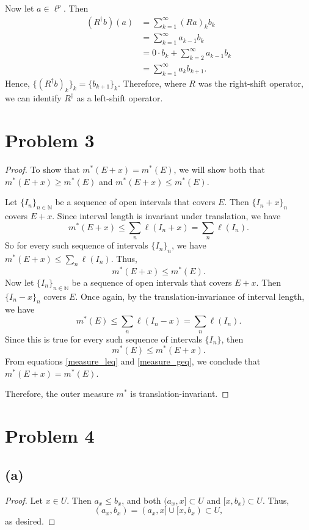 \documentclass{article}
\begin{document}
Now let $a\in\ell^p$. Then 
\begin{align}
	\left(R^{\dagger}b\right)(a) &= \sum_{k=1}^{\infty}\left(Ra\right)_k b_k \\
	&= \sum_{k=1}^{\infty} a_{k-1}b_k \\
	&= 0\cdot b_k + \sum_{k=2}^{\infty}a_{k-1}b_k \\
	&= \sum_{k=1}^{\infty}a_k b_{k+1}. 
\end{align}
Hence, $\{\left(R^{\dagger}b\right)_k\}_k = \{b_{k+1}\}_k$. Therefore, where $R$ was the right-shift operator, we can identify $R^{\dagger}$ as a left-shift operator.
\section*{Problem 3}
\begin{proof}
	To show that $m^*(E+x)=m^*(E)$, we will show both that \\$m^*(E+x)\geq m^*(E)$ and $m^*(E+x)\leq m^*(E)$.
	
	Let $\{I_n\}_{n\in\mathbb{N}}$ be a sequence of open intervals that covers $E$. Then $\{I_n + x\}_n$ covers $E+x$. Since interval length is invariant under translation, we have
	\begin{equation}
		m^*(E+x) \leq \sum_n \ell(I_n+x) = \sum_n\ell(I_n).
	\end{equation}
	So for every such sequence of intervals $\{I_n\}_n$, we have $m^*(E+x)\leq \sum_n\ell(I_n)$. Thus, 
	\begin{equation}\label{measure_leq}
		m^*(E+x)\leq m^*(E).
	\end{equation}
	Now let $\{I_n\}_{n\in\mathbb{N}}$ be a sequence of open intervals that covers $E+x$. Then $\{I_n-x\}_n$ covers $E$. Once again, by the translation-invariance of interval length, we have
	\begin{equation}
		m^*(E) \leq \sum_n\ell(I_n-x) = \sum_n\ell(I_n).
	\end{equation}
	Since this is true for every such sequence of intervals $\{I_n\}$, then
	\begin{equation}\label{measure_geq}
		m^*(E) \leq m^*(E+x).
	\end{equation}
	From equations \eqref{measure_leq} and \eqref{measure_geq}, we conclude that $m^*(E+x)=m^*(E)$.
	
	Therefore, the outer measure $m^*$ is translation-invariant.
\end{proof}
\section*{Problem 4}
\subsection*{(a)}
\begin{proof}
	Let $x \in U$. Then $a_x \leq b_x$, and both $(a_x, x]\subset U$ and $[x, b_x) \subset U$. Thus, 
	\begin{equation}
		(a_x, b_x) = (a_x, x] \cup [x, b_x) \subset U,
	\end{equation} 
	as desired.
\end{proof}
\end{document}

